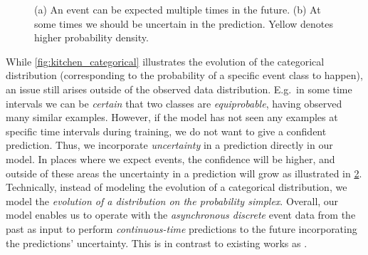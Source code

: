 \begin{figure}
\begin{subfigure}{.4 \linewidth}
                \vspace*{-0.6cm}
                \caption{}
                \label{fig:kitchen_uncertainty}
        \end{subfigure}
        \caption{(a) An event can be expected multiple times in the future. (b) At some times we should be uncertain in the prediction. Yellow denotes higher probability density.}
\end{figure}
While \cref{fig:kitchen_categorical} illustrates the evolution of the categorical distribution (corresponding to the probability of a specific event class to happen), an issue still arises outside of the observed data distribution. {E.g.\ in some time intervals we can be \textit{certain} that two classes are \textit{equiprobable}, having observed many similar examples. However,} if the model has not seen any examples at specific time intervals during training, we do not want to give a confident prediction. Thus, we incorporate \textit{uncertainty} in a prediction directly in our model. In places where we expect events, the confidence will be higher, and outside of these areas the uncertainty in a prediction will grow as illustrated in \cref{fig:kitchen_uncertainty}. Technically, instead of modeling the evolution of a categorical distribution, we model the \textit{evolution of a distribution on the probability simplex}.
%
Overall, our model enables us to operate with the \textit{asynchronous discrete} event data from the past as input to perform \textit{continuous-time} predictions to the future incorporating the predictions' uncertainty. This is in contrast to existing works as \cite{RMTPP, hawkes}.
